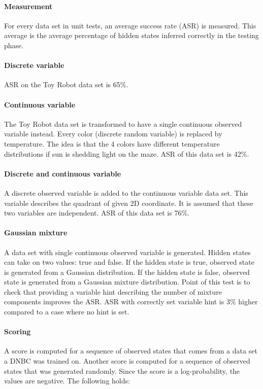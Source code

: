 \documentclass[thesis=B,english]{FITthesis}[2012/06/26]
\begin{document}
\paragraph{Measurement}
For every data set in unit tests, an average success rate (ASR) is measured. This average is the average percentage of hidden states inferred correctly in the testing phase.

\paragraph{Discrete variable}
ASR on the Toy Robot data set is 65\%.

\paragraph{Continuous variable}
The Toy Robot data set is transformed to have a single continuous observed variable instead. Every color (discrete random variable) is replaced by temperature. The idea is that the 4 colors have different temperature distributions if sun is shedding light on the maze. ASR of this data set is 42\%.

\paragraph{Discrete and continuous variable}
A discrete observed variable is added to the continuous variable data set. This variable describes the quadrant of given 2D coordinate. It is assumed that these two variables are independent. ASR of this data set is 76\%.

\paragraph{Gaussian mixture}
A data set with single continuous observed variable is generated. Hidden states can take on two values: true and false. If the hidden state is true, observed state is generated from a Gaussian distribution. If the hidden state is false, observed state is generated from a Gaussian mixture distribution. Point of this test is to check that providing a variable hint describing the number of mixture components improves the ASR. ASR with correctly set variable hint is 3\% higher compared to a case where no hint is set.

\paragraph{Scoring}
A score is computed for a sequence of observed states that comes from a data set a DNBC was trained on. Another score is computed for a sequence of observed states that was generated randomly. Since the score is a log-probability, the values are negative. The following holds:
\end{document}
